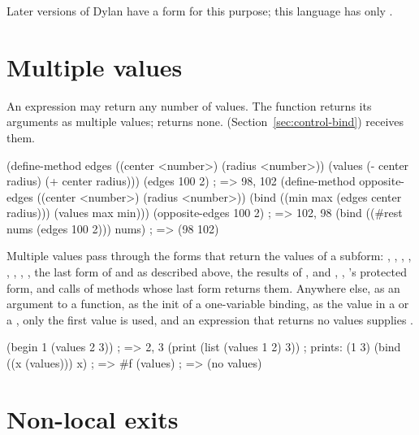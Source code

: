Later versions of Dylan have a  form for this purpose; this
language has only .

\section{Multiple values}\label{sec:control-values}

\begin{quote}
\end{quote}

\noindent An expression may return any number of values. The function
 returns its arguments as multiple values; 
returns none.  (Section~\ref{sec:control-bind}) receives them.

\begin{dylan}
(define-method edges ((center <number>) (radius <number>))
  (values (- center radius) (+ center radius)))
(edges 100 2)            ; => 98, 102
(define-method opposite-edges ((center <number>) (radius <number>))
  (bind ((min max (edges center radius)))
    (values max min)))
(opposite-edges 100 2)   ; => 102, 98
(bind ((#rest nums (edges 100 2)))
  nums)                  ; => (98 102)
\end{dylan}

\noindent Multiple values pass through the forms that return the values
of a subform: , , , ,
, , , , the last form of
 and  as described above, the results of ,
 and , , 's
protected form, and calls of methods whose last form returns them. Anywhere
else, as an argument to a function, as the init of a one-variable binding,
as the value in a  or a , only the first value is
used, and an expression that returns no values supplies .

\begin{dylan}
(begin 1 (values 2 3))   ; => 2, 3
(print (list (values 1 2) 3))   ; prints: (1 3)
(bind ((x (values))) x)  ; => #f
(values)                 ; => (no values)
\end{dylan}

\section{Non-local exits}\label{sec:control-exits}

